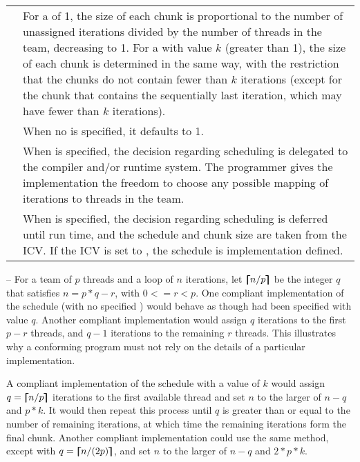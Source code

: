 \begin{supertabular}{ p{0.8in} p{4.3in} }
 & For a  of 1, the size of each chunk is proportional to the
number of unassigned iterations divided by the number of threads in the team,
decreasing to 1. For a  with value $k$ (greater than 1), the
size of each chunk is determined in the same way, with the restriction
that the chunks do not contain fewer than $k$ iterations (except for the
chunk that contains the sequentially last iteration, which may have fewer
than $k$ iterations). 
\\

 & When no  is specified, it defaults to 1.\\

 & When  is specified, the decision regarding scheduling is 
delegated to the compiler and/or runtime system. The programmer gives the 
implementation the freedom to choose any possible mapping of iterations to 
threads in the team.\\

 & When  is specified, the decision regarding scheduling 
is deferred until run time, and the schedule and chunk size are taken from the 
 ICV. If the ICV is set to , the schedule is implementation 
defined.\\
\end{supertabular}
\linenumbers
\bigskip\bigskip


\notestart
\noteheader – For a team of $p$ threads and a loop of $n$ iterations, let $\bm{\lceil\mkern-10mu\lceil} n/p \bm{\rceil\mkern-10mu\rceil}$ be the integer $q$ 
that satisfies $n = p*q - r$, with $0 <= r < p$. One compliant implementation of the  
schedule (with no specified ) would behave as though  had been 
specified with value $q$. Another compliant implementation would assign $q$ iterations to 
the first $p-r$ threads, and $q-1$ iterations to the remaining $r$ threads. This illustrates why a 
conforming program must not rely on the details of a particular implementation. 

A compliant implementation of the  schedule with a  value of $k$ 
would assign $q = \bm{\lceil\mkern-10mu\lceil} n/p \bm{\rceil\mkern-10mu\rceil}$ iterations to the first available thread and set $n$ to the larger of 
$n-q$ and $p*k$. It would then repeat this process until $q$ is greater than or equal to the 
number of remaining iterations, at which time the remaining iterations form the final 
chunk. Another compliant implementation could use the same method, except with 
$q = \bm{\lceil\mkern-10mu\lceil} n/(2p) \bm{\rceil\mkern-10mu\rceil}$, and set $n$ to the larger of $n-q$ and $2*p*k$. 
\noteend

